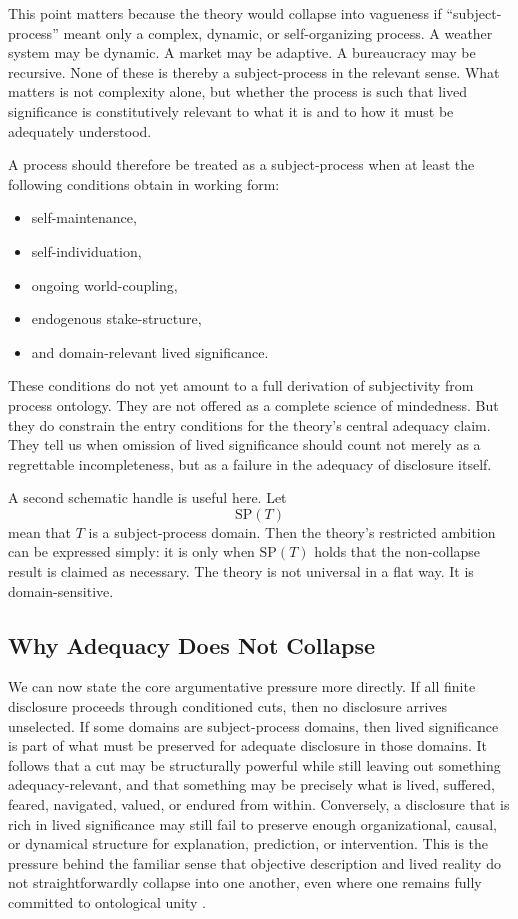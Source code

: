 \documentclass[11pt]{article}
\begin{document}
This point matters because the theory would collapse into vagueness if ``subject-process'' meant only a complex, dynamic, or self-organizing process. A weather system may be dynamic. A market may be adaptive. A bureaucracy may be recursive. None of these is thereby a subject-process in the relevant sense. What matters is not complexity alone, but whether the process is such that lived significance is constitutively relevant to what it is and to how it must be adequately understood.

A process should therefore be treated as a subject-process when at least the following conditions obtain in working form:
\begin{itemize}
    \item self-maintenance,
    \item self-individuation,
    \item ongoing world-coupling,
    \item endogenous stake-structure,
    \item and domain-relevant lived significance.
\end{itemize}

These conditions do not yet amount to a full derivation of subjectivity from process ontology. They are not offered as a complete science of mindedness. But they do constrain the entry conditions for the theory's central adequacy claim. They tell us when omission of lived significance should count not merely as a regrettable incompleteness, but as a failure in the adequacy of disclosure itself.

A second schematic handle is useful here. Let
\[
\mathrm{SP}(T)
\]
mean that \(T\) is a subject-process domain. Then the theory's restricted ambition can be expressed simply: it is only when \(\mathrm{SP}(T)\) holds that the non-collapse result is claimed as necessary. The theory is not universal in a flat way. It is domain-sensitive.

\subsection{Why Adequacy Does Not Collapse}

We can now state the core argumentative pressure more directly. If all finite disclosure proceeds through conditioned cuts, then no disclosure arrives unselected. If some domains are subject-process domains, then lived significance is part of what must be preserved for adequate disclosure in those domains. It follows that a cut may be structurally powerful while still leaving out something adequacy-relevant, and that something may be precisely what is lived, suffered, feared, navigated, valued, or endured from within. Conversely, a disclosure that is rich in lived significance may still fail to preserve enough organizational, causal, or dynamical structure for explanation, prediction, or intervention. This is the pressure behind the familiar sense that objective description and lived reality do not straightforwardly collapse into one another, even where one remains fully committed to ontological unity \cite{Nagel1974,Levine1983,Chalmers1995}.
\end{document}
